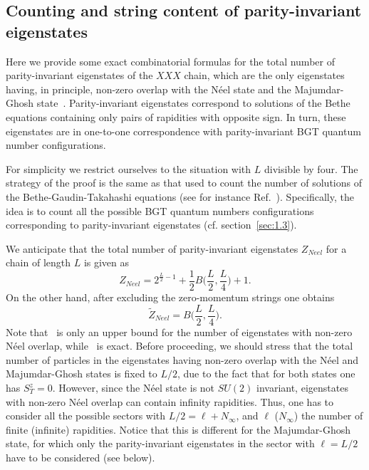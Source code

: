 \documentclass[11pt]{iopart}
\begin{document}
\subsection{Counting and string content of parity-invariant eigenstates}
\label{app-1}

Here we provide some exact combinatorial formulas for the total number of 
parity-invariant eigenstates of the $XXX$ chain, which are the only eigenstates 
having, in principle, non-zero overlap with the N\'eel state and the 
Majumdar-Ghosh state~\cite{brockmann-2014}. 
Parity-invariant eigenstates correspond to solutions of the Bethe equations 
containing only pairs of rapidities with opposite sign. In turn, these  
eigenstates are in one-to-one correspondence with parity-invariant BGT quantum number 
configurations. %

For simplicity we restrict ourselves 
to the situation with $L$ divisible by four. The strategy of the proof is the 
same as that used to count the number of solutions of the Bethe-Gaudin-Takahashi 
equations (see for instance Ref.~\cite{faddeev-1996}).  Specifically, the idea 
is to count all the possible BGT quantum numbers configurations corresponding 
to parity-invariant eigenstates (cf. section~\ref{sec:1.3}). 

We anticipate that the total number of parity-invariant eigenstates $Z_{Neel}$ 
for a chain of length $L$ is given as 
%
\begin{equation}
\label{N-count}
Z_{Neel}=2^{\frac{L}{2}-1}+\frac{1}{2}B\Big(\frac{L}{2},\frac{L}{4}\Big)+1. 
\end{equation}
%
On the other hand, after excluding the zero-momentum strings one obtains 
%
\begin{equation}
\label{N-count-nz}
\widetilde Z_{Neel}=B\Big(\frac{L}{2},\frac{L}{4}\Big). 
\end{equation}
%
Note that~ is only an upper bound for the number of eigenstates 
with non-zero N\'eel overlap, while~ is exact. Before 
proceeding, we should stress that the total number of particles  
in the eigenstates having non-zero overlap with the N\'eel and Majumdar-Ghosh 
states is fixed to $L/2$, due to the fact that for both states one has $S_T^z=0$. 
However, since the N\'eel state is not $SU(2)$ invariant, eigenstates with 
non-zero N\'eel overlap can contain infinity rapidities. Thus, one has to 
consider all the possible sectors with $L/2=\ell+N_{\infty}$, and $\ell$ 
($N_\infty$) the number of finite (infinite) rapidities. Notice that this 
is different for the Majumdar-Ghosh state, for which only the parity-invariant 
eigenstates in the sector with $\ell=L/2$ have to be considered (see below). 
\end{document}
